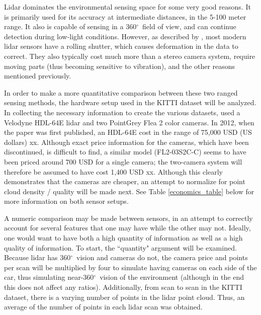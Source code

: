 \def \deg {$ ^{\circ}$\ } %

Lidar dominates the environmental sensing space for some very good reasons. It is primarily used for its accuracy at intermediate distances, in the 5-100 meter range. It also is capable of sensing in a 360\deg field of view, and can continue detection during low-light conditions. However, as described by \cite{broggi_sensors_2013}, most modern lidar sensors have a rolling shutter, which causes deformation in the data to correct. They also typically cost much more than a stereo camera system, require moving parts (thus becoming sensitive to vibration), and the other reasons mentioned previously. 

In order to make a more quantitative comparison between these two ranged sensing methods, the hardware setup used in the KITTI dataset will be analyzed. In collecting the necessary information to create the various datasets, \cite{geiger_are_2012} used a Velodyne HDL-64E lidar and two PointGrey Flea 2 color cameras. In 2012, when the paper was first published, an HDL-64E cost in the range of 75,000 USD (US dollars) xx. Although exact price information for the cameras, which have been discontinued, is difficult to find, a similar model (FL2-03S2C-C) seems to have been priced around 700 USD for a single camera; the two-camera system will therefore be assumed to have cost 1,400 USD xx. Although this clearly demonstrates that the cameras are cheaper, an attempt to normalize for point cloud density / quality will be made next. See Table \ref{economics_table} below for more information on both sensor setups. 

A numeric comparison may be made between sensors, in an attempt to correctly account for several features that one may have while the other may not. Ideally, one would want to have both a high quantity of information as well as a high quality of information. To start, the ``quantity" argument will be examined. Because lidar has 360\deg vision and cameras do not, the camera price and points per scan will be multiplied by four to simulate having cameras on each side of the car, thus simulating near-360\deg vision of the environment (although in the end this does not affect any ratios). Additionally, from scan to scan in the KITTI dataset, there is a varying number of points in the lidar point cloud. Thus, an average of the number of points in each lidar scan was obtained.

